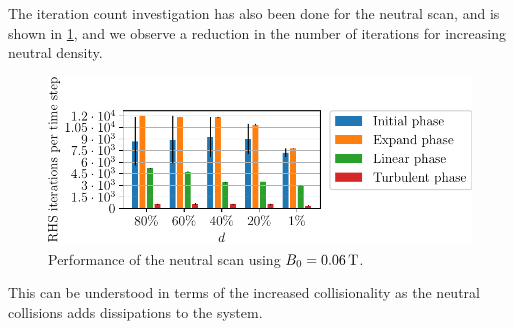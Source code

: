 The iteration count investigation has also been done for the neutral scan, and is shown in \cref{fig:neutPerformance}, and we observe a reduction in the number of iterations for increasing neutral density.
%
\begin{figure}[htb]
    \centering
    \includegraphics{fig/results/performance/RHSEvalsPerTimeNeutralScan}
    \caption{Performance of the neutral scan using $B_0=0.06\, \text{T}$.}
    \label{fig:neutPerformance}
\end{figure}
%
This can be understood in terms of the increased collisionality as the neutral collisions adds dissipations to the system.

